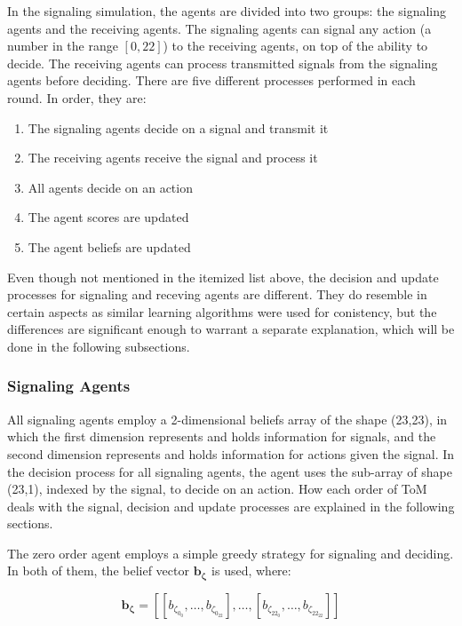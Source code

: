 In the signaling simulation, the agents are divided into two groups: the signaling agents and the receiving agents. The signaling agents can signal any action (a number in the range $[0,22]$) to the receiving agents, on top of the ability to decide. The receiving agents can process transmitted signals from the signaling agents before deciding. There are five different processes performed in each round. In order, they are:

\begin{enumerate}
    \item The signaling agents decide on a signal and transmit it
    \item The receiving agents receive the signal and process it
    \item All agents decide on an action
    \item The agent scores are updated  
    \item The agent beliefs are updated
\end{enumerate}

Even though not mentioned in the itemized list above, the decision and update processes for signaling and receving agents are different. They do resemble in certain aspects as similar learning algorithms were used for conistency, but the differences are significant enough to warrant a separate explanation, which will be done in the following subsections.

\subsubsection{Signaling Agents}

All signaling agents employ a 2-dimensional beliefs array of the shape (23,23), in which the first dimension represents and holds information for signals, and the second dimension represents and holds information for actions given the signal. In the decision process for all signaling agents, the agent uses the sub-array of shape (23,1), indexed by the signal, to decide on an action. How each order of ToM deals with the signal, decision and update processes are explained in the following sections.


The zero order agent employs a simple greedy strategy for signaling and deciding. In both of them, the belief vector $\mathbf{b_{\zeta}}$ is used, where: 

\[
\mathbf{b_{\zeta}} = [[b_{\zeta_{0_{0}}}, \ldots, b_{\zeta_{0_{22}}}], \ldots, [b_{\zeta_{22_{0}}}, \ldots, b_{\zeta_{22_{22}}}]]
\]

